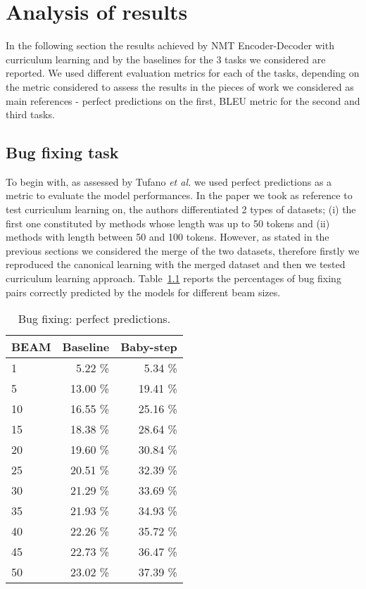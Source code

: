 \chapter{Analysis of results}
In the following section the results 
achieved by NMT Encoder-Decoder with curriculum learning and
by the baselines for the 3 tasks we considered are reported.
We used different evaluation metrics for each of the tasks, depending on the metric considered to 
assess the results in the pieces of work we considered as main references - perfect predictions on the first, 
BLEU metric for the second and third tasks. 

\section{Bug fixing task}
To begin with, as assessed by Tufano \textit{et al.} \cite{Tufano2019} we used 
perfect predictions as a metric to evaluate the model performances. In the paper we took as reference
to test curriculum learning on, the authors differentiated 2 types of datasets; (i) the first one constituted by methods
whose length was up to 50 tokens and (ii) methods with length between 50 and 100 tokens. 
However, as stated in the previous sections
we considered the merge of the two datasets, 
therefore firstly we reproduced the canonical learning with the merged dataset and then we tested curriculum learning
approach.
Table~\ref{table:pp_bugfixing} reports the percentages %
of bug fixing pairs correctly predicted
by the models for different beam sizes.
\begin{table}[h!]
    \centering
    \begin{tabular}{l|r|r}
    BEAM & Baseline & Baby-step\\ [0.5ex]
    \hline 
    1 & 5.22 \% & 5.34 \%\\ 
    5 & 13.00 \% & 19.41 \%\\
    10 & 16.55 \% & 25.16 \%\\
    15 & 18.38 \% & 28.64 \%\\
    20 & 19.60 \% & 30.84 \%\\
    25 & 20.51 \% & 32.39 \%\\
    30 & 21.29 \% & 33.69 \%\\
    35 & 21.93 \% & 34.93 \%\\
    40 & 22.26 \% & 35.72 \%\\
    45 & 22.73 \% & 36.47 \%\\
    50 & 23.02 \% & 37.39 \%\\ [1ex]
    \end{tabular}
    \caption{Bug fixing: perfect predictions.}
    \label{table:pp_bugfixing}
\end{table}
